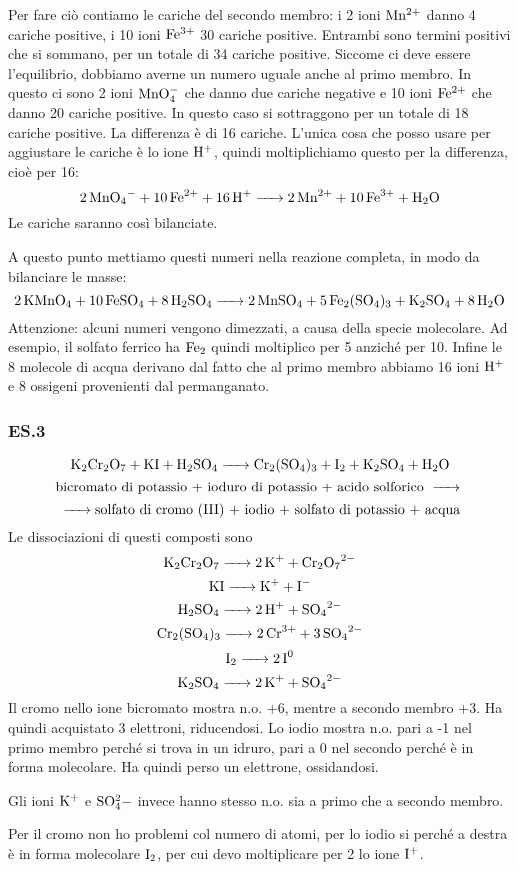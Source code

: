 Per fare ciò contiamo le cariche del secondo membro: i 2 ioni $\rm Mn^{2+}$ danno 4 cariche positive, i 10 ioni $\rm Fe^{3+}$ 30 cariche positive. Entrambi sono termini positivi che si sommano, per un totale di 34 cariche positive. Siccome ci deve essere l'equilibrio, dobbiamo averne un numero uguale anche al primo membro. In questo ci sono 2 ioni $\rm MnO_4^-$ che danno due cariche negative e 10 ioni $\rm Fe^{2+}$ che danno 20 cariche positive. In questo caso si sottraggono per un totale di 18 cariche positive. La differenza è di 16 cariche. L'unica cosa che posso usare per aggiustare le cariche è lo ione $\rm H^+$, quindi moltiplichiamo questo per la differenza, cioè per 16:
$$\ce{2MnO_4- + 10Fe^2+ + 16H+ -> 2Mn^2+ + 10Fe^3+ + H_2O}$$
Le cariche saranno così bilanciate.

A questo punto mettiamo questi numeri nella reazione completa, in modo da bilanciare le masse:
$$\ce{2KMnO_4 + 10FeSO_4 + 8H_2SO_4 -> 2MnSO_4 + 5Fe_2(SO_4)_3 + K_2SO_4 + 8H_2O}$$
Attenzione: alcuni numeri vengono dimezzati, a causa della specie molecolare. Ad esempio, il solfato ferrico ha $\rm Fe_2$ quindi moltiplico per 5 anziché per 10. Infine le 8 molecole di acqua derivano dal fatto che al primo membro abbiamo 16 ioni $\rm H^+$ e 8 ossigeni provenienti dal permanganato.

\vspace{0.2cm}\subsubsection{\textbf{ES.3}}
$$\ce{K_2Cr_2O_7 + KI + H_2SO_4 -> Cr_2(SO_4)_3 + I_2 + K_2SO_4 + H_2O}$$
$$\text{bicromato di potassio + ioduro di potassio + acido solforico \ce{->}}$$
$${\ce{->} \text{solfato di cromo (III) +  iodio + solfato di potassio + acqua}}$$
Le dissociazioni di questi composti sono
$$\ce{K_2Cr_2O_7 -> 2K^+ + Cr_2O_7^2-}$$ 
$$\ce{KI -> K+ + I-}$$
$$\ce{H_2SO_4 -> 2H+ + SO_4^2-}$$
$$\ce{Cr_2(SO_4)_3 -> 2Cr^3+ + 3SO_4^2-}$$
$$\ce{I_2 -> 2I^0}$$
$$\ce{K_2SO_4 -> 2K+ + SO_4^2-}$$
Il cromo nello ione bicromato mostra n.o. +6, mentre a secondo membro +3. Ha quindi acquistato 3 elettroni, riducendosi.
Lo iodio mostra n.o. pari a -1 nel primo membro perché si trova in un idruro, pari a 0 nel secondo perché è in forma molecolare. Ha quindi perso un elettrone, ossidandosi. 

Gli ioni $\rm K^+$ e $\rm SO_4^2-$ invece hanno stesso n.o. sia a primo che a secondo membro.

Per il cromo non ho problemi col numero di atomi, per lo iodio si perché a destra è in forma molecolare $\rm I_2$, per cui devo moltiplicare per 2 lo ione $\rm I^+$.

